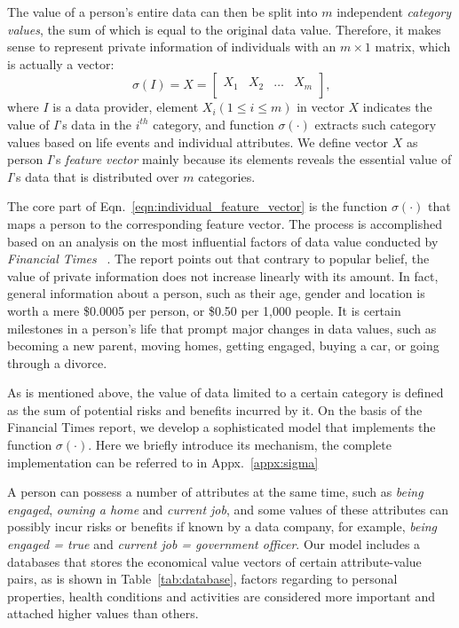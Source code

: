 \documentclass{mcmthesis}
\begin{document}
The value of a person's entire data can then be split into $m$ independent \emph{category values}, the sum of which is equal to the original data value. Therefore, it makes sense to represent private information of individuals with an $m \times 1$ matrix, which is actually a vector:
\begin{equation}
    \sigma (I) = X = \left[\begin{matrix}
    X_1 & X_2 & \dots & X_m \\
    \end{matrix}\right]\text{,} \label{eqn:individual_feature_vector}
\end{equation}
where $I$ is a data provider, element $X_i (1 \leq i \leq m)$ in vector $X$ indicates the value of $I$'s data in the $i^{th}$ category, and function $\sigma(\cdot)$ extracts such category values based on life events and individual attributes. We define vector $X$ as person $I$'s \emph{feature vector} mainly because its elements reveals the essential value of $I$'s data that is distributed over $m$ categories.

The core part of Eqn.~\eqref{eqn:individual_feature_vector} is the function $\sigma(\cdot)$ that maps a person to the corresponding feature vector. The process is accomplished based on an analysis on the most influential factors of data value conducted by \emph{Financial Times} ~\cite{value_report}. The report points out that contrary to popular belief, the value of private information does not increase linearly with its amount. In fact, general information about a person, such as their age, gender and location is worth a mere \$0.0005 per person, or \$0.50 per 1,000 people. It is certain milestones in a person's life that prompt major changes in data values, such as becoming a new parent, moving homes, getting engaged, buying a car, or going through a divorce.

As is mentioned above, the value of data limited to a certain category is defined as the sum of potential risks and benefits incurred by it. On the basis of the Financial Times report, we develop a sophisticated model that implements the function $\sigma(\cdot)$. Here we briefly introduce its mechanism, the complete implementation can be referred to in Appx.~\ref{appx:sigma}

A person can possess a number of attributes at the same time, such as \emph{being engaged}, \emph{owning a home} and \emph{current job}, and some values of these attributes can possibly incur risks or benefits if known by a data company, for example, \emph{being engaged = true} and \emph{current job = government officer}. Our model includes a databases that stores the economical value vectors of certain attribute-value pairs, as is shown in Table~\ref{tab:database}, factors regarding to personal properties, health conditions and activities are considered more important and attached higher values than others.
\end{document}
